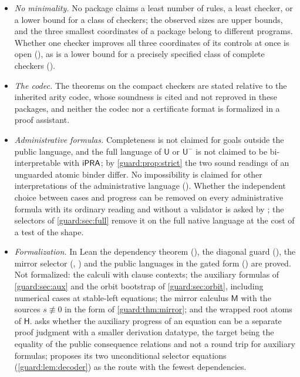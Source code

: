 \begin{itemize}
\item \emph{No minimality.}  No package claims a least number of rules, a
 least checker, or a lower bound for a class of checkers; the observed sizes
 are upper bounds, and the three smallest coordinates of a package belong
 to different programs.  Whether one checker improves all three coordinates
 of its controls at once is open (), as is a lower
 bound for a precisely specified class of complete checkers
 ().
\item \emph{The codec.}  The theorems on the compact checkers are stated
 relative to the inherited arity codec, whose soundness is cited and not
 reproved in these packages, and neither the codec nor a certificate format
 is formalized in a proof assistant.
\item \emph{Administrative formulas.}  Completeness is not claimed for goals
 outside the public language, and the full language of $\mathsf U$ or
 $\mathsf U^{-}$ is not claimed to be bi-interpretable with $\mathsf{iPRA}$; by
 \cref{guard:prop:strict} the two sound readings of an unguarded atomic
 binder differ.  No impossibility is claimed for other interpretations of
 the administrative language ().  Whether the
 independent choice between cases and progress can be removed on every
 administrative formula with its ordinary reading and without a validator
 is asked by ; the selectors of \cref{guard:sec:full}
 remove it on the full native language at the cost of a test of the shape.
\item \emph{Formalization.}  In Lean the dependency theorem
 (), the diagonal guard (), the mirror
 selector (, ) and the public languages in the
 gated form () are proved.  Not formalized: the calculi with
 clause contexts; the auxiliary formulas of \cref{guard:sec:aux} and the
 orbit bootstrap of \cref{guard:sec:orbit}, including numerical cases at
 stable-left equations; the mirror calculus $\mathsf M$ with the sources
 $s\not\equiv 0$ in the form of \cref{guard:thm:mirror}; and the wrapped
 root atoms of $\mathsf H$.   asks whether
 the auxiliary progress of an equation can be a separate proof judgment
 with a smaller derivation datatype, the target being the equality of the
 public consequence relations and not a round trip for auxiliary formulas;
  proposes its two unconditional selector equations
 (\cref{guard:lem:decoder}) as the route with the fewest dependencies.

\end{itemize}
